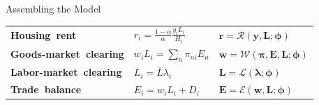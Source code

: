 \documentclass[aspectratio=169,11pt]{beamer}
\newcommand{\B}[1]{\textcolor{blue1}{\textbf{#1}}}
\begin{document}
\begin{frame}[t]{Assembling the Model}
{\begin{tabular}{
    @{}>{\raggedright\arraybackslash}m{}
    >{\centering\arraybackslash}m{}
    >{\centering\arraybackslash}m{}@{}}
    \mbox{\B{Housing rent}}
      & \(\displaystyle r_i=\frac{1-\alpha}{\alpha}\frac{y_iL_i}{H_i}\)
      & \(\displaystyle \mathbf r=\mathcal R
        (\mathbf y,\mathbf L;\boldsymbol\phi)\)
      \tabularnewline[0.12em]

    \mbox{\B{Goods-market clearing}}
      & \(\displaystyle w_iL_i=\sum_n\pi_{ni}E_n\)
      & \(\displaystyle \mathbf w=\mathcal W(\boldsymbol\pi,\mathbf E,\mathbf L;\boldsymbol\phi)\)
      \tabularnewline[0.14em]

    \mbox{\B{Labor-market clearing}}
      & \(\displaystyle L_i=\bar L\lambda_i\)
      & \(\displaystyle \mathbf L=\mathcal L(\boldsymbol\lambda;\boldsymbol\phi)\)
      \tabularnewline[0.14em]

    \mbox{\B{Trade balance}}
      & \(\displaystyle E_i=w_iL_i+D_i\)
      & \(\displaystyle \mathbf E=\mathcal E
        (\mathbf w,\mathbf L;\boldsymbol\phi)\)
      \tabularnewline
  \end{tabular}
  }
\end{frame}
\end{document}
